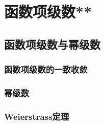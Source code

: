\chapter{函数项级数**}
\section{函数项级数与幂级数}
\subsection{函数项级数的一致收敛}
\clearpage
\subsection{幂级数}
\clearpage
\subsection{Weierstrass定理}
\clearpage
